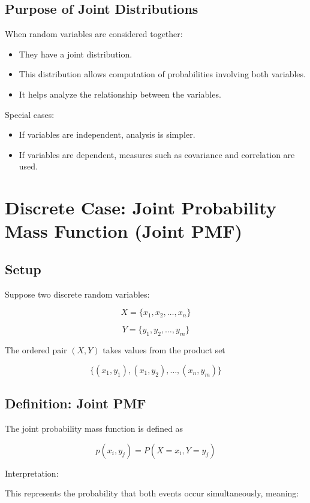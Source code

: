 \documentclass{article}
\begin{document}
\subsection{Purpose of Joint Distributions}

When random variables are considered together:

\begin{itemize}
\item They have a joint distribution.
\item This distribution allows computation of probabilities involving both variables.
\item It helps analyze the relationship between the variables.
\end{itemize}

Special cases:

\begin{itemize}
\item If variables are independent, analysis is simpler.
\item If variables are dependent, measures such as covariance and correlation are used.
\end{itemize}

\section{Discrete Case: Joint Probability Mass Function (Joint PMF)}

\subsection{Setup}

Suppose two discrete random variables:

\[
X = \{x_1,x_2,\ldots,x_n\}
\]

\[
Y = \{y_1,y_2,\ldots,y_m\}
\]

The ordered pair $(X,Y)$ takes values from the product set

\[
\{(x_1,y_1),(x_1,y_2),\ldots,(x_n,y_m)\}
\]

\subsection{Definition: Joint PMF}

The joint probability mass function is defined as

\[
p(x_i,y_j)=P(X=x_i,Y=y_j)
\]

Interpretation:

This represents the probability that both events occur simultaneously, meaning:
\end{document}
